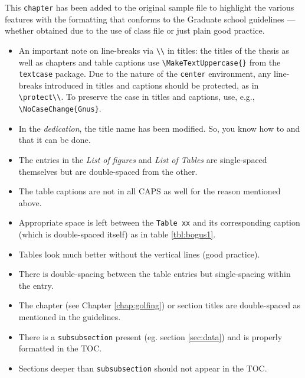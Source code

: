 \documentclass[final,numrefs,sort&compress]{nddiss2e}
\begin{document}
%
%

This \verb+chapter+ has been added to the original sample file to highlight the
various features with the formatting that conforms to the Graduate school
guidelines --- whether obtained due to the use of \nddiss\/ class file or just
plain good practice.
\begin{itemize}
\item An important note on line-breaks via \verb+\\+ in titles: the
  titles of the thesis as well as chapters and table captions use
  \verb+\MakeTextUppercase{}+ from the \verb+textcase+ package.  Due
  to the nature of the \verb+center+ environment, any line-breaks
  introduced in titles and captions should be protected, as in
  \verb+\protect\\+.
  To preserve the case in titles and captions, use, e.g.,
  \verb+\NoCaseChange{Gnus}+.
\item In the \emph{dedication}, the title name has been modified. So, you know
how to and that it can be done.
\item The entries in the \emph{List of figures} and \emph{List of Tables} are
single-spaced themselves but are double-spaced from the other.
\item The table captions are not in all CAPS as well for the reason mentioned
above.
\item Appropriate space is left between the \verb+Table xx+ and its
corresponding caption (which is double-spaced itself) as in table \ref{tbl:bogus1}.
\item Tables look much better without the vertical lines (good practice).
\item There is double-spacing between the table entries but single-spacing
within the entry.
\item The chapter (see Chapter \ref{chap:golfing}) or section titles are
double-spaced as mentioned in the guidelines.
\item There is a \verb+subsubsection+ present (eg. section \ref{sec:data}) and
is properly formatted in the TOC.
\item Sections deeper than \verb+subsubsection+ should not appear in the TOC.

\end{itemize}
\end{document}
